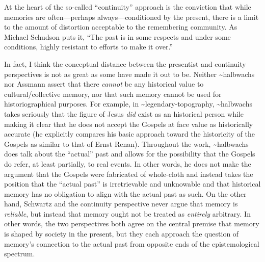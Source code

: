 At the heart of the so-called ``continuity'' approach is the conviction
that while memories are often---perhaps always---conditioned by the
present, there is a limit to the amount of distortion acceptable to the
remembering community. As Michael Schudson puts it, ``The past is in
some respects and under some conditions, highly resistant to efforts to
make it over.''\autocite[107]{schudson_communication1989}

In fact, I think the conceptual distance between the presentist and
continuity perspectives is not as great as some have made it out to be.
Neither \textasciitilde{}halbwachs nor Assmann assert that there
\emph{cannot} be any historical value to cultural/collective memory, nor
that such memory cannot be used for historiographical purposes. For
example, in \textasciitilde{}legendary-topography,
\textasciitilde{}halbwachs takes seriously that the figure of Jesus
\emph{did} exist as an historical person while making it clear that he
does not accept the Gospels at face value as historically accurate (he
explicitly compares his basic approach toward the historicity of the
Gospels as similar to that of Ernst Renan). Throughout the work,
\textasciitilde{}halbwachs does talk about the ``actual'' past and
allows for the possibility that the Gospels do refer, at least
partially, to real events. In other words, he does not make the argument
that the Gospels were fabricated of whole-cloth and instead takes the
position that the ``actual past'' is irretrievable and unknowable and
that historical memory has no obligation to align with the actual past
as such. On the other hand, Schwartz and the continuity perspective
never argue that memory is \emph{reliable}, but instead that memory
ought not be treated as \emph{entirely} arbitrary. In other words, the
two perspectives both agree on the central premise that memory is shaped
by society in the present, but they each approach the question of
memory's connection to the actual past from opposite ends of the
epistemological spectrum.

